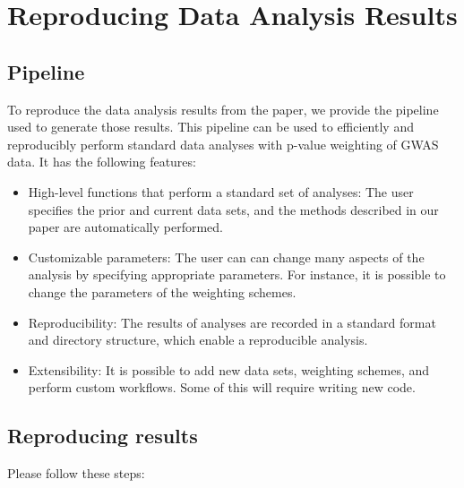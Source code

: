 \documentclass[english,11pt]{article} %
\begin{document}
\section{Reproducing Data Analysis Results}
\label{repro}

\subsection{Pipeline}

To reproduce the data analysis results from the \cite{dobriban2015optimal} paper, we provide the pipeline used to generate those results. This pipeline can be used to efficiently and reproducibly perform standard data analyses with p-value weighting of GWAS data.  It has the following features:

\begin{itemize}
\item High-level functions that perform a standard set of analyses: The user specifies the prior and current data sets, and the methods described in our paper are automatically performed.

\item Customizable parameters: The user can can change many aspects of the analysis by specifying appropriate parameters. For instance, it is possible to change the parameters of the weighting schemes.

\item Reproducibility: The results of analyses are recorded in a standard format and directory structure, which enable a reproducible analysis.

\item Extensibility:  It is possible to add new data sets, weighting schemes, and perform custom workflows. Some of this will require writing new code.
\end{itemize}

\subsection{Reproducing results}

Please follow these steps:
\end{document}
